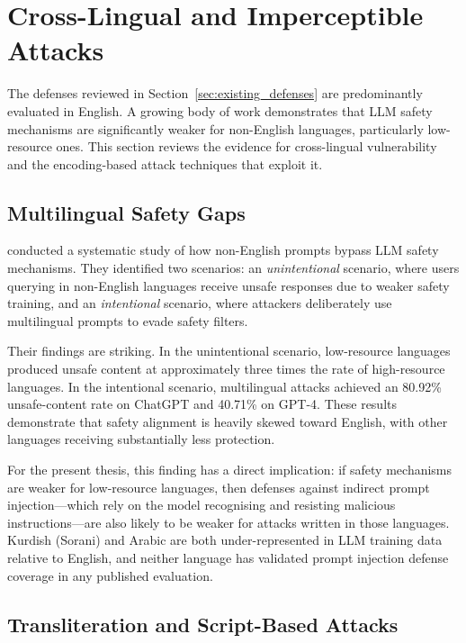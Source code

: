 \section{Cross-Lingual and Imperceptible Attacks}
\label{sec:crosslingual}

The defenses reviewed in Section~\ref{sec:existing_defenses} are predominantly evaluated in English.  A growing body of work demonstrates that LLM safety mechanisms are significantly weaker for non-English languages, particularly low-resource ones.  This section reviews the evidence for cross-lingual vulnerability and the encoding-based attack techniques that exploit it.

\subsection{Multilingual Safety Gaps}

\textcite{deng2024multilingual} conducted a systematic study of how non-English prompts bypass LLM safety mechanisms.  They identified two scenarios: an \emph{unintentional} scenario, where users querying in non-English languages receive unsafe responses due to weaker safety training, and an \emph{intentional} scenario, where attackers deliberately use multilingual prompts to evade safety filters.

Their findings are striking.  In the unintentional scenario, low-resource languages produced unsafe content at approximately three times the rate of high-resource languages.  In the intentional scenario, multilingual attacks achieved an 80.92\% unsafe-content rate on ChatGPT and 40.71\% on GPT-4.  These results demonstrate that safety alignment is heavily skewed toward English, with other languages receiving substantially less protection.

For the present thesis, this finding has a direct implication: if safety mechanisms are weaker for low-resource languages, then defenses against indirect prompt injection---which rely on the model recognising and resisting malicious instructions---are also likely to be weaker for attacks written in those languages.  Kurdish (Sorani) and Arabic are both under-represented in LLM training data relative to English, and neither language has validated prompt injection defense coverage in any published evaluation.

\subsection{Transliteration and Script-Based Attacks}

